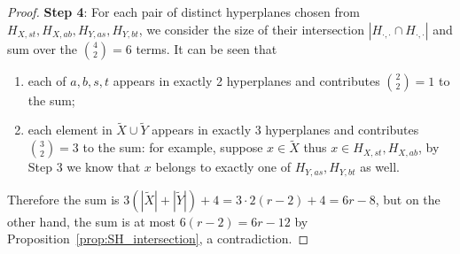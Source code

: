 \documentclass[10pt,a4paper]{amsart}
\begin{document}
\begin{proof}
    {\bf Step 4}: For each pair of distinct hyperplanes chosen from $H_{X,st}, H_{X,ab}, H_{Y,as}, H_{Y,bt}$, we consider the size of their intersection $|H_{\cdot,\cdot}\cap H_{\cdot,\cdot}|$ and sum over the $\binom{4}{2}=6$ terms. It can be seen that
    \begin{enumerate}
        \item each of $a,b,s,t$ appears in exactly 2 hyperplanes and contributes $\binom{2}{2}=1$ to the sum;
        \item each element in $\widetilde{X}\cup\widetilde{Y}$ appears in exactly 3 hyperplanes and contributes $\binom{3}{2}=3$ to the sum: for example, suppose $x\in\widetilde{X}$ thus $x\in H_{X,st}, H_{X,ab}$, by Step 3 we know that $x$ belongs to exactly one of $ H_{Y,as}, H_{Y,bt}$ as well.
    \end{enumerate}
    Therefore the sum is $3(|\widetilde{X}|+|\widetilde{Y}|)+4=3\cdot 2(r-2)+4=6r-8$, but on the other hand, the sum is at most $6(r-2)=6r-12$ by Proposition~\ref{prop:SH_intersection}, a contradiction.
\end{proof}
\end{document}
